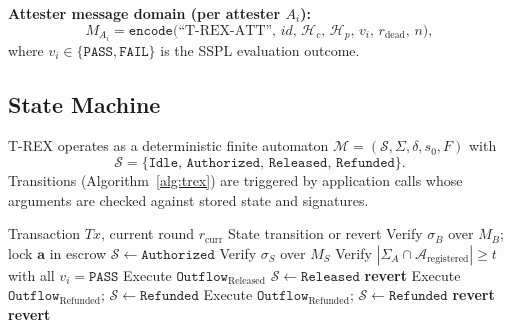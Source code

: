 \documentclass[journal]{IEEEtran}
\newcommand{\set}[1]{\mathcal{#1}}
\begin{document}
\noindent\textbf{Attester message domain (per attester $A_i$):}
\begin{equation}
M_{A_i} = \texttt{encode}\bigl(\text{``T-REX-ATT''},\, id,\,
\set{H}_c,\, \set{H}_p,\, v_i,\, r_{\text{dead}},\, n\bigr),
\end{equation}
where $v_i \in \{\texttt{PASS}, \texttt{FAIL}\}$ is the SSPL
evaluation outcome.

\subsection{State Machine}
T-REX operates as a deterministic finite automaton
$\set{M} = (\set{S}, \Sigma, \delta, s_0, F)$ with
\begin{equation}
\set{S} = \{\texttt{Idle},\, \texttt{Authorized},\,
\texttt{Released},\, \texttt{Refunded}\}.
\end{equation}
Transitions (Algorithm~\ref{alg:trex}) are triggered by application
calls whose arguments are checked against stored state and
signatures.

\begin{algorithm}[h]
\caption{T-REX state transitions (AVM logic)}
\label{alg:trex}
\begin{algorithmic}[1]
\Require Transaction $Tx$, current round $r_{\text{curr}}$
\Ensure State transition or revert
  \State Verify $\sigma_B$ over $M_B$; lock $\mathbf{a}$ in escrow
  \State $\set{S} \leftarrow \texttt{Authorized}$
  \State Verify $\sigma_S$ over $M_S$
  \State Verify $|\Sigma_A \cap \set{A}_{\text{registered}}| \ge t$
    with all $v_i = \texttt{PASS}$
    \State Execute $\texttt{Outflow}_{\text{Released}}$
    \State $\set{S} \leftarrow \texttt{Released}$
  \Else
    \State \textbf{revert}
  \EndIf
{}
    \State Execute $\texttt{Outflow}_{\text{Refunded}}$;
    $\set{S} \leftarrow \texttt{Refunded}$
  \ElsIf{$|\Sigma_A \cap \set{A}_{\text{registered}}| \ge t
    \;\land\; v_i = \texttt{FAIL}$}
    \State Execute $\texttt{Outflow}_{\text{Refunded}}$;
    $\set{S} \leftarrow \texttt{Refunded}$
  \Else
    \State \textbf{revert}
  \EndIf
\Else
  \State \textbf{revert}
\EndIf
\end{algorithmic}
\end{algorithm}
\end{document}

